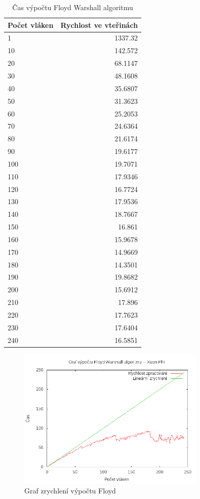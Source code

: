 \documentclass[10pt,a4paper]{article}
\begin{document}
\begin{table}[H]
  \centering
	\caption{Čas výpočtu Floyd Warshall algoritmu}
	\begin{tabular}{| l | r |}
\hline
Počet vláken & Rychlost ve vteřinách \\ \hline
1 & 1337.32 \\ \hline
10 & 142.572 \\ \hline
20 & 68.1147 \\ \hline
30 & 48.1608 \\ \hline
40 & 35.6807 \\ \hline
50 & 31.3623 \\ \hline
60 & 25.2053 \\ \hline
70 & 24.6364 \\ \hline
80 & 21.6174 \\ \hline
90 & 19.6177 \\ \hline
100 & 19.7071 \\ \hline
110 & 17.9346 \\ \hline
120 & 16.7724 \\ \hline
130 & 17.9536 \\ \hline
140 & 18.7667 \\ \hline
150 & 16.861 \\ \hline
160 & 15.9678 \\ \hline
170 & 14.9669 \\ \hline
180 & 14.3501 \\ \hline
190 & 19.8682 \\ \hline
200 & 15.6912 \\ \hline
210 & 17.896 \\ \hline
220 & 17.7623 \\ \hline
230 & 17.6404 \\ \hline
240 & 16.5851 \\ \hline
	\end{tabular}
  \label{tab:djph}
\end{table}

\begin{figure}[H]
  \centering
    \includegraphics[width=0.8\textwidth]{graf_floyd_phi.png}
  \caption{Graf zrychlení výpočtu Floyd}
  \label{fig:floydphi}
\end{figure}
\end{document}
